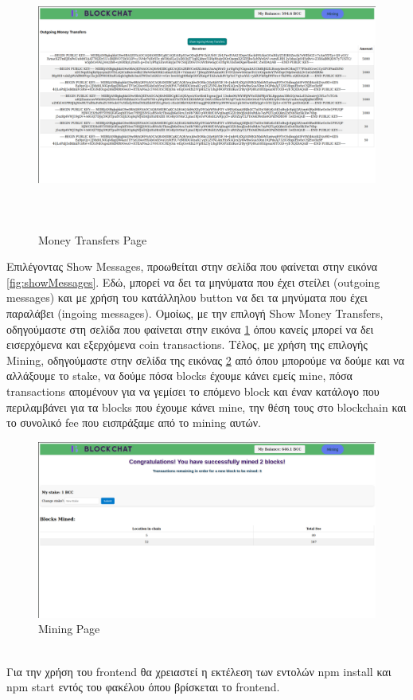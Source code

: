 \documentclass[12pt, a4paper]{article}
\begin{document}
\begin{figure}[h!]
	\centering
	\includegraphics[width=7in,height=3.5in]{sc7.png}
	\caption{Money Transfers Page}
	\label{fig:showMoneyTrans}
\end{figure}
Επιλέγοντας Show Messages, προωθείται στην σελίδα που φαίνεται στην εικόνα \ref{fig:showMessages}. Εδώ, μπορεί να δει τα μηνύματα που έχει στείλει (outgoing messages) και με χρήση του κατάλληλου button να δει τα μηνύματα που έχει παραλάβει (ingoing messages). Ομοίως, με την επιλογή Show Money Transfers, οδηγούμαστε στη σελίδα που φαίνεται στην εικόνα \ref{fig:showMoneyTrans} όπου κανείς μπορεί να δει εισερχόμενα και εξερχόμενα coin transactions.
Τέλος, με χρήση της επιλογής Mining, οδηγούμαστε στην σελίδα της εικόνας \ref{fig:miningPage} από όπου μπορούμε να δούμε και να αλλάξουμε το stake, να δούμε πόσα blocks έχουμε κάνει εμείς mine, πόσα transactions απομένουν για να γεμίσει το επόμενο block και έναν κατάλογο που περιλαμβάνει για τα blocks που έχουμε κάνει mine, την θέση τους στο blockchain και το συνολικό fee που εισπράξαμε από το mining αυτών.
\begin{figure}[h!]
	\centering
	\includegraphics[width=7in]{sc6.png}
	\caption{Mining Page}
	\label{fig:miningPage}
\end{figure}
\\Για την χρήση του frontend θα χρειαστεί η εκτέλεση των εντολών npm install και npm start εντός του φακέλου όπου βρίσκεται το frontend.
\end{document}
